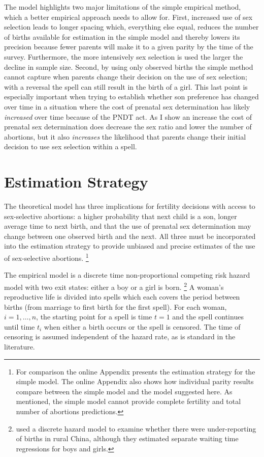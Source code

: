 \documentclass[12pt,letterpaper]{article}
\begin{document}
The model highlights two major limitations of the simple 
empirical method, which a better empirical approach needs to 
allow for.
First, increased use of sex selection leads to longer spacing which,
everything else equal, reduces the number of births available for 
estimation in the simple model and thereby lowers its precision
because fewer parents will make it to a given parity by the time of the survey.
Furthermore, the more intensively sex selection is used the larger 
the decline in sample size.
Second, by using only observed births the simple method cannot capture
when parents change their decision on the use of sex selection;
with a reversal the spell can still result in the birth of a girl.
This last point is especially important when trying to establish whether 
son preference has changed over time in a situation where the cost of prenatal 
sex determination has likely \emph{increased} over time because of the PNDT act.
As I show an increase the cost of prenatal sex determination does 
decrease the sex ratio and lower the number of abortions, but 
it also \emph{increases} the likelihood that parents change their initial
decision to use sex selection within a spell.




\section{Estimation Strategy\label{sec:strategy}}

The theoretical model has three implications for fertility decisions with access to 
sex-selective abortions: 
a higher probability that next child is a son, 
longer average time to next birth, 
and that the use of prenatal sex determination may change between one observed birth and 
the next.
All three must be incorporated into the estimation strategy
to provide unbiased and precise estimates of the use of sex-selective abortions.%
\footnote{
For comparison the online Appendix presents the estimation strategy 
for the simple model.
The online Appendix also shows how individual parity results compare 
between the simple model and the model suggested here.
As mentioned, the simple model cannot provide complete fertility 
and total number of abortions predictions.
}

The empirical model is a discrete time non-proportional competing risk hazard model with 
two exit states: either a boy or a girl is born.%
\footnote{
\cite{merli00} used a discrete hazard model to examine whether 
there were under-reporting of births in rural China, although they 
estimated separate waiting time regressions for boys and girls.
}
A woman's reproductive life is divided into spells which each covers the period between
births (from marriage to first birth for the first spell).
For each woman, $i=1,\ldots,n$, the starting point for a spell is time $t=1$ and 
the spell continues until time $t_i$ when either a birth occurs or the spell is censored.
The time of censoring is assumed independent of the hazard rate,
as is standard in the literature.
\end{document}
